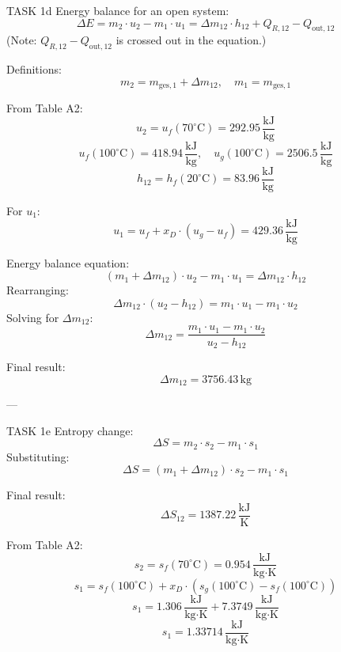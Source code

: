 TASK 1d  
Energy balance for an open system:  
\[
\Delta E = m_2 \cdot u_2 - m_1 \cdot u_1 = \Delta m_{12} \cdot h_{12} + Q_{R,12} - Q_{\text{out},12}
\]  
(Note: \( Q_{R,12} - Q_{\text{out},12} \) is crossed out in the equation.)  

Definitions:  
\[
m_2 = m_{\text{ges},1} + \Delta m_{12}, \quad m_1 = m_{\text{ges},1}
\]  

From Table A2:  
\[
u_2 = u_f(70^\circ\text{C}) = 292.95 \, \frac{\text{kJ}}{\text{kg}}
\]  
\[
u_f(100^\circ\text{C}) = 418.94 \, \frac{\text{kJ}}{\text{kg}}, \quad u_g(100^\circ\text{C}) = 2506.5 \, \frac{\text{kJ}}{\text{kg}}
\]  
\[
h_{12} = h_f(20^\circ\text{C}) = 83.96 \, \frac{\text{kJ}}{\text{kg}}
\]  

For \( u_1 \):  
\[
u_1 = u_f + x_D \cdot (u_g - u_f) = 429.36 \, \frac{\text{kJ}}{\text{kg}}
\]  

Energy balance equation:  
\[
(m_1 + \Delta m_{12}) \cdot u_2 - m_1 \cdot u_1 = \Delta m_{12} \cdot h_{12}
\]  
Rearranging:  
\[
\Delta m_{12} \cdot (u_2 - h_{12}) = m_1 \cdot u_1 - m_1 \cdot u_2
\]  
Solving for \( \Delta m_{12} \):  
\[
\Delta m_{12} = \frac{m_1 \cdot u_1 - m_1 \cdot u_2}{u_2 - h_{12}}
\]  

Final result:  
\[
\Delta m_{12} = 3756.43 \, \text{kg}
\]  

---

TASK 1e  
Entropy change:  
\[
\Delta S = m_2 \cdot s_2 - m_1 \cdot s_1
\]  
Substituting:  
\[
\Delta S = (m_1 + \Delta m_{12}) \cdot s_2 - m_1 \cdot s_1
\]  

Final result:  
\[
\Delta S_{12} = 1387.22 \, \frac{\text{kJ}}{\text{K}}
\]  

From Table A2:  
\[
s_2 = s_f(70^\circ\text{C}) = 0.954 \, \frac{\text{kJ}}{\text{kg·K}}
\]  
\[
s_1 = s_f(100^\circ\text{C}) + x_D \cdot (s_g(100^\circ\text{C}) - s_f(100^\circ\text{C}))
\]  
\[
s_1 = 1.306 \, \frac{\text{kJ}}{\text{kg·K}} + 7.3749 \, \frac{\text{kJ}}{\text{kg·K}}
\]  
\[
s_1 = 1.33714 \, \frac{\text{kJ}}{\text{kg·K}}
\]